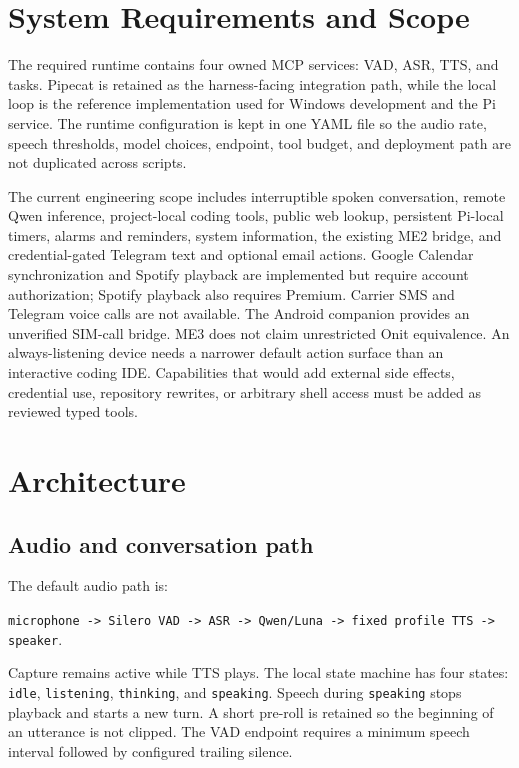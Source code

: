 \documentclass[sigconf,nonacm,balance=false]{acmart}
\begin{document}
\section{System Requirements and Scope}

The required runtime contains four owned MCP services: VAD, ASR, TTS, and
tasks. Pipecat is retained as the harness-facing integration path, while the
local loop is the reference implementation used for Windows development and
the Pi service. The runtime configuration is kept in one YAML file so the
audio rate, speech thresholds, model choices, endpoint, tool budget, and
deployment path are not duplicated across scripts.

The current engineering scope includes interruptible spoken conversation,
remote Qwen inference, project-local coding tools, public web lookup, persistent
Pi-local timers, alarms and reminders, system information, the existing ME2
bridge, and credential-gated Telegram text and optional email actions. Google
Calendar synchronization and Spotify playback are implemented but require
account authorization; Spotify playback also requires Premium. Carrier SMS and
Telegram voice calls are not available. The Android companion provides an
unverified SIM-call bridge. ME3 does not claim unrestricted Onit equivalence.
An always-listening device needs a narrower default action
surface than an interactive coding IDE. Capabilities that would add external
side effects, credential use, repository rewrites, or arbitrary shell access
must be added as reviewed typed tools.

\section{Architecture}

\subsection{Audio and conversation path}

The default audio path is:
\begin{center}
\texttt{microphone -> Silero VAD -> ASR -> Qwen/Luna -> fixed profile TTS -> speaker}.
\end{center}
Capture remains active while TTS plays. The local state machine has four states:
\texttt{idle}, \texttt{listening}, \texttt{thinking}, and \texttt{speaking}.
Speech during \texttt{speaking} stops playback and starts a new turn. A short
pre-roll is retained so the beginning of an utterance is not clipped. The VAD
endpoint requires a minimum speech interval followed by configured trailing
silence.
\end{document}
